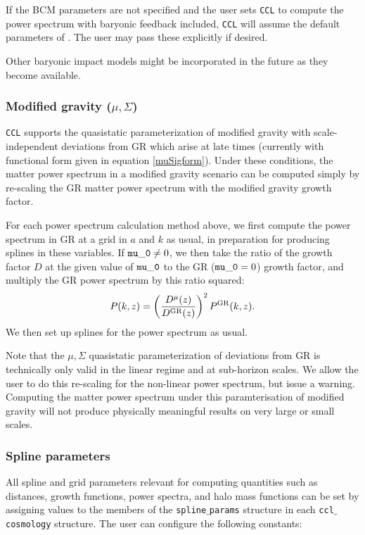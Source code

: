 \documentclass[\docopts]{\docclass}
\newcommand{\ccl}{{\tt CCL}\xspace}
\begin{document}
If the BCM parameters are not specified and the user sets \ccl to compute the power spectrum with baryonic feedback included, \ccl will assume the default parameters of \citet{Schneider15}. The user may pass these explicitly if desired.

Other baryonic impact models might be incorporated in the future as they become available.

\subsubsection{Modified gravity ($\mu, \Sigma$)}
\ccl supports the quasistatic parameterization of modified gravity with scale-independent deviations from GR which arise at late times (currently with functional form given in equation \ref{muSigform}). Under these conditions, the matter power spectrum in a modified gravity scenario can be computed simply by re-scaling the GR matter power spectrum with the modified gravity growth factor.

For each power spectrum calculation method above, we first compute the power spectrum in GR at a grid in $a$ and $k$ as usual, in preparation for producing splines in these variables. If ${\tt mu\_0} \ne 0$, we then take the ratio of the growth factor $D$ at the given value of ${\tt mu\_0}$ to the GR (${\tt mu\_0}=0$) growth factor, and multiply the GR power spectrum by this ratio squared:
\begin{equation}
P(k,z) = \left(\frac{D^{\mu}(z)}{D^{\rm GR}(z)}\right)^2 P^{\rm GR}(k,z).
\label{Pkmu}
\end{equation}
We then set up splines for the power spectrum as usual. 

Note that the $\mu, \Sigma$ quasistatic parameterization of deviations from GR is technically only valid in the linear regime and at sub-horizon scales. We allow the user to do this re-scaling for the non-linear power spectrum, but issue a warning. Computing the matter power spectrum under this paramterisation of modified gravity will not produce physically meaningful results on very large or small scales. 

\subsubsection{Spline parameters}

All spline and grid parameters relevant for computing quantities such as distances, growth functions, power spectra, and halo mass functions can be set by assigning values to the members of the {\tt spline$\_$params} structure in each {\tt ccl$\_$cosmology} structure.
The user can configure the following constants:
\end{document}
